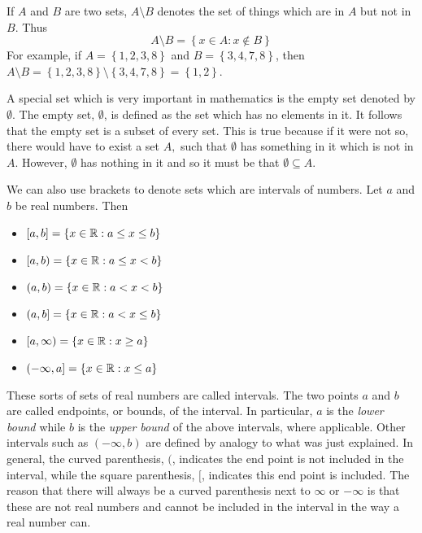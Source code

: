If $A$ and $B$ are two sets, $A\setminus B$\index{$\setminus$} denotes the set of things which
are in $A$ but not in $B.$ Thus
\begin{equation*}
A\setminus B =  \left\{ x\in A:x\notin B\right\} 
\end{equation*}
For example, if $A = \left\{1,2,3,8 \right\}$ and $B = \left\{ 3,4,7,8 \right\}$, then $A \setminus B = \left\{ 1,2,3,8\right\} \setminus 
\left\{ 3,4,7,8 \right\} =\left\{1,2 \right\}$.

A special set which is very important in mathematics is the empty set denoted by $\emptyset .$ The empty set, $\emptyset $, is
defined as the set which has no elements in it. It follows that the empty set is a subset of every set. 
This is true because if it were not so, there would have to exist a set $A,$ such that $\emptyset $
has something in it which is not in $A.$ However, $\emptyset $ has nothing
in it and so it must be that $\emptyset \subseteq A.$

We can also use brackets to denote sets which are intervals of numbers. Let $a$ and $b$ be real numbers. Then

\begin{itemize}
\item
$\left[ a,b\right] = \{x \in \mathbb{R}: a\leq x\leq b \}$

\item $\left[a,b \right) = \{x \in \mathbb{R}: a\leq x<b \}$ 

\item $\left( a,b\right) = \{x \in \mathbb{R}: a<x<b \}$ 

\item $(a,b] = \{ x \in \mathbb{R}: a<x\leq b \}$

\item  $[a,\infty ) = \{x \in \mathbb{R}: x\geq a \}$ 

\item $(-\infty ,a] = \{x \in \mathbb{R}: x \leq a \}$ 
\end{itemize}

These sorts of sets of real
numbers are called intervals. The two points $a$ and $b$ are called
endpoints, or bounds, of the interval. In particular, $a$ is the {\em lower bound \em}  while $b$ is the {\em upper bound \em} of the above
intervals, where applicable. Other intervals such as $\left( -\infty ,b\right) $
are defined by analogy to what was just explained.
 In general, the curved
parenthesis, $($, indicates the end point is not included in the interval, while
the square parenthesis, $[$, indicates this end point is included. The reason that
there will always be a curved parenthesis next to $\infty $ or $-\infty $ is
that these are not real numbers and cannot be included in the interval in the way a real number can. 

